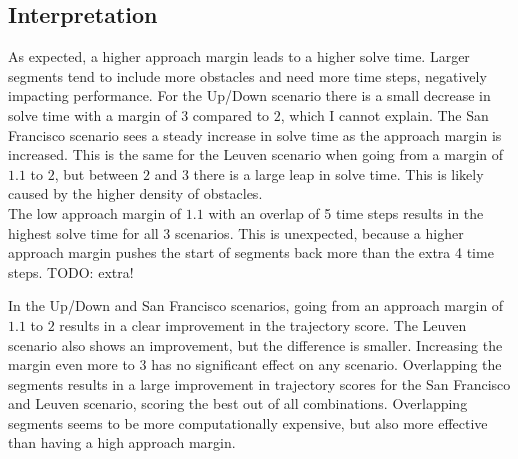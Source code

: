 \subsection{Interpretation}
As expected, a higher approach margin leads to a higher solve time. Larger segments tend to include more obstacles and need more time steps, negatively impacting performance. For the Up/Down scenario there is a small decrease in solve time with a margin of $3$ compared to $2$, which I cannot explain. The San Francisco scenario sees a steady increase in solve time as the approach margin is increased. This is the same for the Leuven scenario when going from a margin of $1.1$ to $2$, but between $2$ and $3$ there is a large leap in solve time. This is likely caused by the higher density of obstacles. \\
The low approach margin of $1.1$ with an overlap of 5 time steps results in the highest solve time for all 3 scenarios. This is unexpected, because a higher approach margin pushes the start of segments back more than the extra 4 time steps. TODO: extra!
\par
In the Up/Down and San Francisco scenarios, going from an approach margin of $1.1$ to $2$ results in a clear improvement in the trajectory score. The Leuven scenario also shows an improvement, but the difference is smaller. Increasing the margin even more to $3$ has no significant effect on any scenario. Overlapping the segments results in a large improvement in trajectory scores for the San Francisco and Leuven scenario, scoring the best out of all combinations. Overlapping segments seems to be more computationally expensive, but also more effective than having a high approach margin. 
